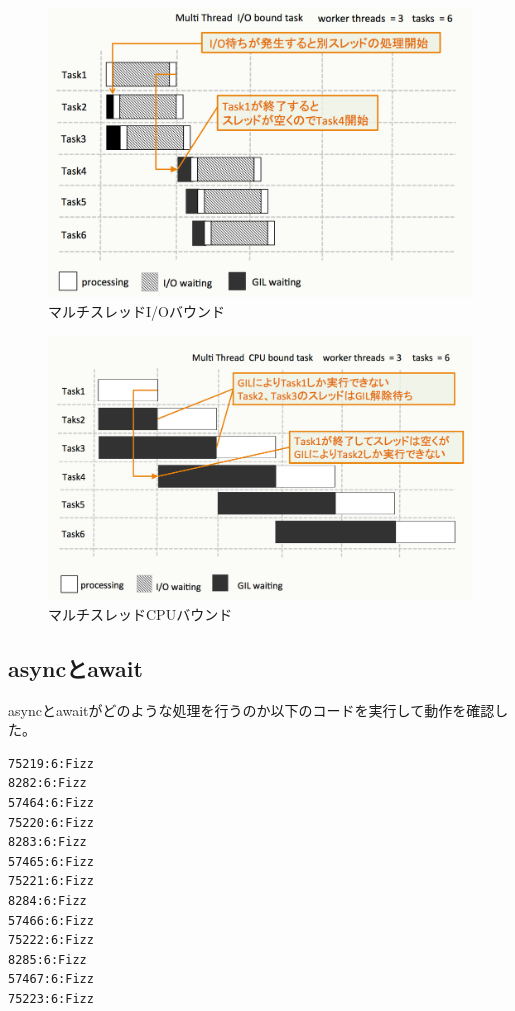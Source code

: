 \documentclass[14pt, oneside]{article}     	%
\begin{document}
\begin{figure}[H]
  \centering
  \includegraphics[width=12cm]{multithred_iobound.png}
  \caption{マルチスレッドI/Oバウンド}
  \label{multithred_iobound}
\end{figure}

\begin{figure}[H]
  \centering
  \includegraphics[width=12cm]{multithred_cpubound.png}
  \caption{マルチスレッドCPUバウンド}
  \label{multithred_cpubound}
\end{figure}

\newpage

\subsection{asyncとawait}
asyncとawaitがどのような処理を行うのか以下のコードを実行して動作を確認した。


\begin{lstlisting}[caption=FizzBuzz実行結果]
75219:6:Fizz
8282:6:Fizz
57464:6:Fizz
75220:6:Fizz
8283:6:Fizz
57465:6:Fizz
75221:6:Fizz
8284:6:Fizz
57466:6:Fizz
75222:6:Fizz
8285:6:Fizz
57467:6:Fizz
75223:6:Fizz
\end{lstlisting}
\end{document}
